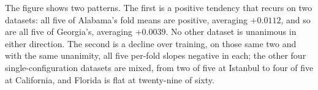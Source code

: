 The figure shows two patterns.
The first is a positive tendency that recurs on two datasets: all five of Alabama's fold means are
positive, averaging $+0.0112$, and so are all five of Georgia's, averaging $+0.0039$. No other
dataset is unanimous in either direction. The second is a decline over training, on those same two
and with the same unanimity, all five per-fold slopes negative in each; the other four
single-configuration datasets are mixed, from two of five at Istanbul to four of five at California,
and Florida is flat at twenty-nine of sixty.

